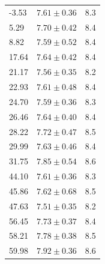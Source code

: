 \documentclass[12pt,preprint]{aastex}
\begin{document}
\begin{table}
\begin{tabular}{l c c}
        -3.53   &    $7.61  \pm    0.36$ & 8.3\\
        5.29   &    $7.70  \pm    0.42$ & 8.4\\
        8.82   &    $7.59  \pm    0.52$ & 8.4\\
       17.64   &    $7.64  \pm    0.42$ & 8.4\\
       21.17   &    $7.56  \pm    0.35$ & 8.2\\
       22.93   &    $7.61  \pm    0.48$ & 8.4\\
       24.70   &    $7.59  \pm    0.36$ & 8.3\\
       26.46   &    $7.64  \pm    0.40$ & 8.4\\
       28.22   &    $7.72  \pm    0.47$ & 8.5\\
       29.99   &    $7.63  \pm    0.46$ & 8.4\\
       31.75   &    $7.85  \pm    0.54$ & 8.6\\
       44.10   &    $7.61  \pm    0.36$ & 8.3\\
       45.86   &    $7.62  \pm    0.68$ & 8.5\\
       47.63   &    $7.51  \pm    0.35$ & 8.2\\
       56.45   &    $7.73  \pm    0.37$ & 8.4\\
       58.21   &    $7.78  \pm    0.38$ & 8.5\\
       59.98   &    $7.92  \pm    0.36$ & 8.6\\

\hline                                   %
\end{tabular}
\end{table}






\end{document}
